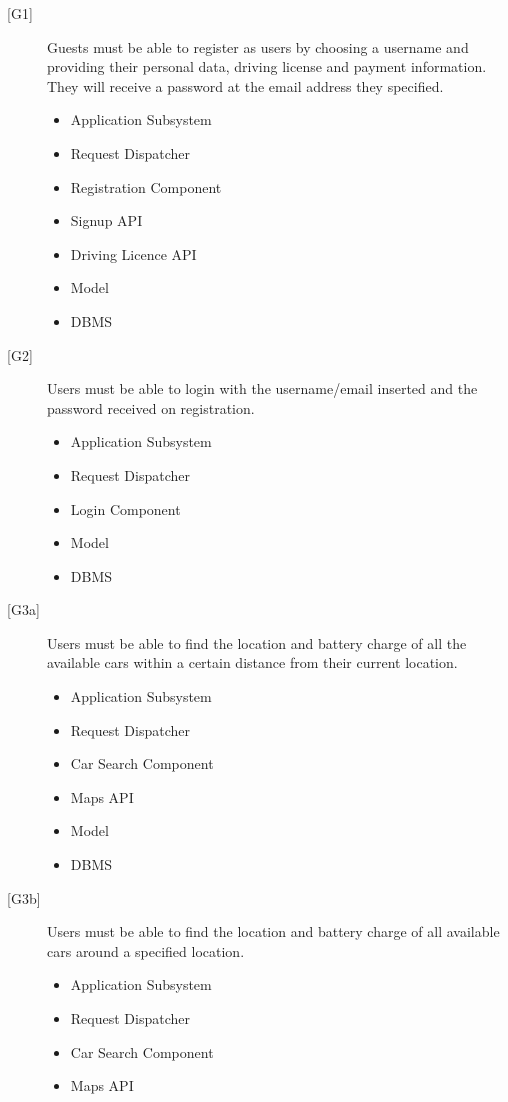 \documentclass[english]{article}
\begin{document}
\begin{description}
	\item[{[G1]}]{Guests must be able to register as users by choosing a username and providing their personal data, driving license and payment information. They will receive a password at the email address they specified.}
	\begin{itemize}
		\item{Application Subsystem}
		\item{Request Dispatcher}
		\item{Registration Component}
		\item{Signup API}
		\item{Driving Licence API}
		\item{Model}
		\item{DBMS}
	\end{itemize}
	\item[{[G2]}]{Users must be able to login with the username/email inserted and the password received on registration.}
	\begin{itemize}
		\item{Application Subsystem}
		\item{Request Dispatcher}
		\item{Login Component}
		\item{Model}
		\item{DBMS}
	\end{itemize}
	\item[{[G3a]}]{Users must be able to find the location and battery charge of all the available cars within a certain distance from their current location.}
	\begin{itemize}
		\item{Application Subsystem}
		\item{Request Dispatcher}
		\item{Car Search Component}
		\item{Maps API}
		\item{Model}
		\item{DBMS}
	\end{itemize}
	\item[{[G3b]}]{Users must be able to find the location and battery charge of all available cars around a specified location.}
	\begin{itemize}
		\item{Application Subsystem}
		\item{Request Dispatcher}
		\item{Car Search Component}
		\item{Maps API}

\end{itemize}
\end{description}
\end{document}
